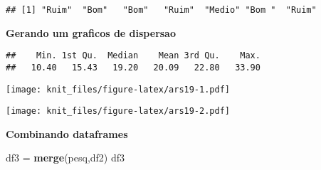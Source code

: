 \documentclass[]{article}
\newenvironment{Shaded}{\begin{snugshade}}{\end{snugshade}}
\newcommand{\KeywordTok}[1]{\textcolor[rgb]{0.13,0.29,0.53}{\textbf{#1}}}
\newcommand{\StringTok}[1]{\textcolor[rgb]{0.31,0.60,0.02}{#1}}
\newcommand{\CommentTok}[1]{\textcolor[rgb]{0.56,0.35,0.01}{\textit{#1}}}
\newcommand{\OperatorTok}[1]{\textcolor[rgb]{0.81,0.36,0.00}{\textbf{#1}}}
\newcommand{\NormalTok}[1]{#1}
\begin{document}
\begin{Shaded}
\end{Shaded}

\begin{verbatim}
## [1] "Ruim"  "Bom"   "Bom"   "Ruim"  "Medio" "Bom "  "Ruim"
\end{verbatim}

\textbf{Gerando um graficos de dispersao}

\begin{Shaded}
\end{Shaded}

\begin{verbatim}
##    Min. 1st Qu.  Median    Mean 3rd Qu.    Max. 
##   10.40   15.43   19.20   20.09   22.80   33.90
\end{verbatim}

\begin{Shaded}
\end{Shaded}

\texttt{[image: knit\_files/figure-latex/ars19-1.pdf]}

\begin{Shaded}
\end{Shaded}

\texttt{[image: knit\_files/figure-latex/ars19-2.pdf]}

\textbf{Combinando dataframes}

\begin{Shaded}
\begin{Highlighting}[]
\NormalTok{df3 =}\StringTok{ }\KeywordTok{merge}\NormalTok{(pesq,df2)}
\NormalTok{df3}
\end{Highlighting}
\end{Shaded}
\end{document}
